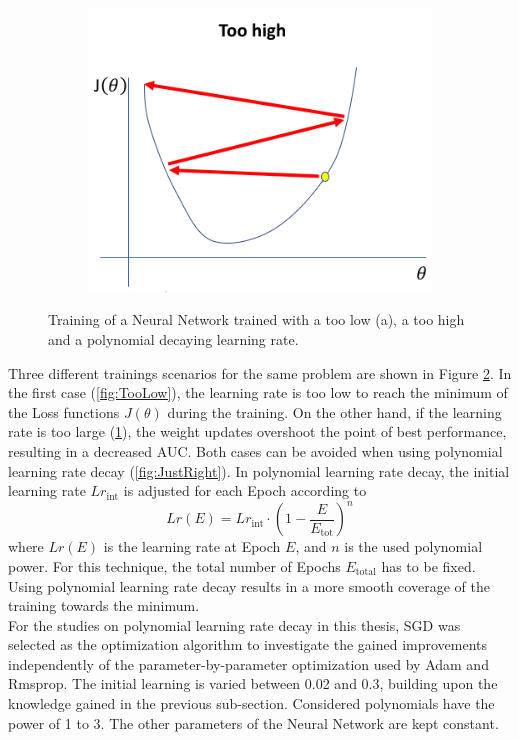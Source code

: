 \begin{figure}[H]
\begin{subfigure}{.33\textwidth}
  \centering
  \includegraphics[width=.99\linewidth]{figs/TooHigh}
  \caption{}
  \label{fig:TooHigh}
\end{subfigure}%
\caption{Training of a Neural Network trained with a too low (a), a too high and a polynomial decaying learning rate. \cite{lrdecay} }
\label{fig:PolyTrain}
\end{figure}


Three different trainings scenarios for the same problem are shown in Figure \ref{fig:PolyTrain}. In the first case (\ref{fig:TooLow}), the learning rate is too low to reach the minimum of the Loss functions $J(\theta)$ during the training. On the other hand, if the learning rate is too large (\ref{fig:TooHigh}), the weight updates overshoot the point of best performance, resulting in a decreased AUC. Both cases can be avoided when using polynomial learning rate decay (\ref{fig:JustRight}). In polynomial learning rate decay, the initial learning rate $Lr_{\text{int}}$ is adjusted for each Epoch according to
\begin{equation}
Lr(E) = Lr_{\text{int}} \cdot (1-\frac{E}{E_{\text{tot}}})^{n}
\end{equation}
where $Lr(E)$ is the learning rate at Epoch $E$, and $n$ is the used polynomial power. For this technique, the total number of Epochs $E_{\text{total}}$ has to be fixed. Using polynomial learning rate decay results in a more smooth coverage of the training towards the minimum. \\
For the studies on polynomial learning rate decay in this thesis, SGD was selected as the optimization algorithm to investigate the gained improvements independently of the parameter-by-parameter optimization used by Adam and Rmsprop. The initial learning is varied between 0.02 and 0.3, building upon the knowledge gained in the previous sub-section. Considered polynomials have the power of 1 to 3. The other parameters of the Neural Network are kept constant. \\

